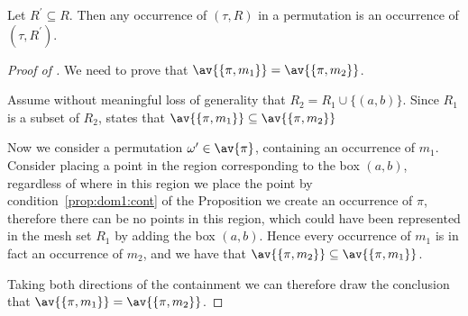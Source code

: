 \begin{note}
    \label{not:downcmesh}
    Let \(R^\prime \subseteq R\). Then any occurrence of \((\tau, R)\) in a permutation
    is an occurrence of \((\tau,R^\prime)\).
\end{note}
%
\begin{proof}[Proof of ]
    We need to prove that \(\av{\{\pi,m_1\}} = \av{\{\pi,m_2\}}\).

    \noindent Assume without meaningful loss of generality that \(R_2 = R_1 \cup \{(a,b)\}\).
    Since \(R_1\) is a subset of \(R_2\),  states that
    \(\av{\{\pi,m_1\}} \subseteq \av{\{\pi,m_2\}}\)

    Now we consider a permutation \(\omega^\prime\in \av{\pi}\),
    containing an occurrence of \(m_1\). Consider placing a point in the
    region corresponding to the box \((a,b)\), regardless of where in this
    region we place the point by condition~\ref{prop:dom1:cont} of the
    Proposition we create an occurrence of \(\pi\), therefore there can be no
    points in this region, which could have been represented in the mesh set
    \(R_1\) by adding the box \((a,b)\). Hence every occurrence of
    \(m_1\) is in fact an occurrence of \(m_2\), and we have that
    \(\av{\{\pi,m_2\}} \subseteq \av{\{\pi,m_1\}}\).

    Taking both directions of the containment we can therefore draw the
    conclusion that \(\av{\{\pi,m_1\}} = \av{\{\pi,m_2\}}\).
\end{proof}

